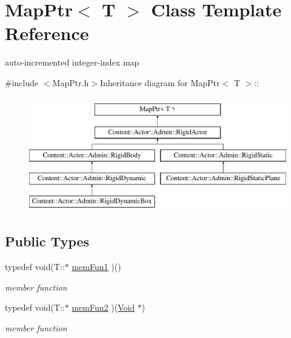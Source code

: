 \hypertarget{classMapPtr}{
\section{MapPtr$<$ T $>$ Class Template Reference}
\label{classMapPtr}
}


auto-\/incremented integer-\/index map  


{\ttfamily \#include $<$MapPtr.h$>$}Inheritance diagram for MapPtr$<$ T $>$::\begin{figure}[H]
\begin{center}
\leavevmode
\includegraphics[height=5cm]{classMapPtr}
\end{center}
\end{figure}
\subsection*{Public Types}
\begin{DoxyCompactItemize}
\item 
\hypertarget{classMapPtr_aa7cb53d536d442c005d3605074cb11b0}{
typedef void(T::$\ast$ \hyperlink{classMapPtr_aa7cb53d536d442c005d3605074cb11b0}{memFun1} )()}
\label{classMapPtr_aa7cb53d536d442c005d3605074cb11b0}

\begin{DoxyCompactList}\small\item\em member function \item\end{DoxyCompactList}\item 
\hypertarget{classMapPtr_a51ffcd92e3106c7fca3bbc14c9a62187}{
typedef void(T::$\ast$ \hyperlink{classMapPtr_a51ffcd92e3106c7fca3bbc14c9a62187}{memFun2} )(\hyperlink{structVoid}{Void} $\ast$)}
\label{classMapPtr_a51ffcd92e3106c7fca3bbc14c9a62187}

\begin{DoxyCompactList}\small\item\em member function \item\end{DoxyCompactList}\end{DoxyCompactItemize}
